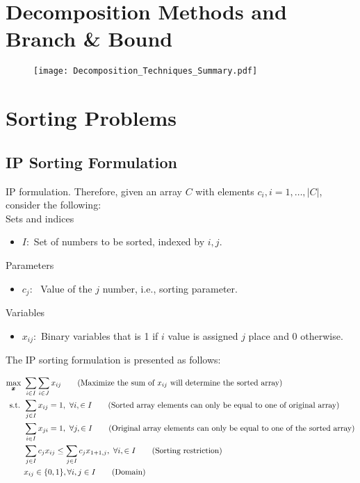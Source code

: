 \documentclass[10pt,bezier]{article}
\begin{document}
\section{Decomposition Methods and Branch \& Bound}\label{section4}

\begin{figure}[!htbp]
    \centering
    \texttt{[image: Decomposition\_Techniques\_Summary.pdf]}
    \label{fig1}
\end{figure}


\newpage
\section{Sorting Problems}\label{section5}

\subsection{IP Sorting Formulation} \label{section5.1}
IP formulation. Therefore, given an array $C$ with elements $c_i, i = 1,\ldots,|C|$, consider the following:\\

\noindent Sets and indices
\begin{itemize}
  \item $I$:~Set of numbers to be sorted, indexed by $i,j$.
\end{itemize}
Parameters
\begin{itemize}
    \item $c_{j}$:~ Value of the $j$ number, i.e., sorting parameter.
\end{itemize}
Variables
\begin{itemize}
  \item $x_{ij}$:~Binary variables that is 1 if $i$ value is assigned $j$ place and 0 otherwise.
\end{itemize}

The IP sorting formulation is presented as follows:

\begin{subequations}
    \begin{align}
    \max_{\pmb{x}}~& \sum_{i \in I} \sum_{i \in J} x_{ij} \tag{Maximize the sum of $x_{ij}$ will determine the sorted array}\\
    \text{s.t. } &  \sum_{j \in I} x_{ij} = 1,~\forall i, \in I \tag{Sorted array elements can only be equal to one of original array}\\
                 & \sum_{i \in I} x_{ji} = 1,~\forall j, \in I \tag{Original array elements can only be equal to one of the sorted array}\\
                 & \sum_{j \in I} c_j x_{ij} \leq  \sum_{j \in I} c_j x_{1+1, j} ,~\forall i, \in I \tag{Sorting restriction}\\
                 & x_{ij} \in \{0,1\}, \forall i, j \in I  \tag{Domain}
    \end{align}
\end{subequations}
\end{document}

